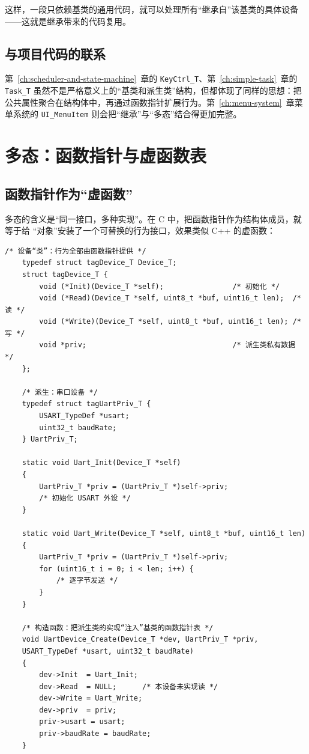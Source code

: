 这样，一段只依赖基类的通用代码，就可以处理所有“继承自”该基类的具体设备——这就是继承带来的代码复用。

\subsection{与项目代码的联系}

第~\ref{ch:scheduler-and-state-machine}~章的 \texttt{KeyCtrl\_T}、第~\ref{ch:simple-task}~章的 \texttt{Task\_T} 虽然不是严格意义上的“基类和派生类”结构，但都体现了同样的思想：把公共属性聚合在结构体中，再通过函数指针扩展行为。第~\ref{ch:menu-system}~章菜单系统的 \texttt{UI\_MenuItem} 则会把“继承”与“多态”结合得更加完整。

\section{多态：函数指针与虚函数表}

\subsection{函数指针作为“虚函数”}

多态的含义是“同一接口，多种实现”。在 C 中，把函数指针作为结构体成员，就等于给 “对象”安装了一个可替换的行为接口，效果类似 C++ 的虚函数：

\begin{lstlisting}[style=c]
	/* 设备“类”：行为全部由函数指针提供 */
	typedef struct tagDevice_T Device_T;
	struct tagDevice_T {
		void (*Init)(Device_T *self);                /* 初始化 */
		void (*Read)(Device_T *self, uint8_t *buf, uint16_t len);  /* 读 */
		void (*Write)(Device_T *self, uint8_t *buf, uint16_t len); /* 写 */
		void *priv;                                  /* 派生类私有数据 */
	};
	
	/* 派生：串口设备 */
	typedef struct tagUartPriv_T {
		USART_TypeDef *usart;
		uint32_t baudRate;
	} UartPriv_T;
	
	static void Uart_Init(Device_T *self)
	{
		UartPriv_T *priv = (UartPriv_T *)self->priv;
		/* 初始化 USART 外设 */
	}
	
	static void Uart_Write(Device_T *self, uint8_t *buf, uint16_t len)
	{
		UartPriv_T *priv = (UartPriv_T *)self->priv;
		for (uint16_t i = 0; i < len; i++) {
			/* 逐字节发送 */
		}
	}
	
	/* 构造函数：把派生类的实现“注入”基类的函数指针表 */
	void UartDevice_Create(Device_T *dev, UartPriv_T *priv,
	USART_TypeDef *usart, uint32_t baudRate)
	{
		dev->Init  = Uart_Init;
		dev->Read  = NULL;      /* 本设备未实现读 */
		dev->Write = Uart_Write;
		dev->priv  = priv;
		priv->usart = usart;
		priv->baudRate = baudRate;
	}
\end{lstlisting}

